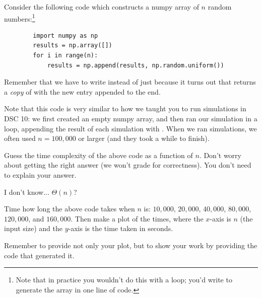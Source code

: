 \begin{prob}
    Consider the following code which constructs a numpy array of $n$ random numbers:\footnote{Note that in practice
        you wouldn't do this with a loop; you'd write  to generate
    the array in one line of code.}

    \begin{verbatim}
        import numpy as np
        results = np.array([])
        for i in range(n):
            results = np.append(results, np.random.uniform())
    \end{verbatim}

    Remember that we have to write 
    instead of just  because it turns out that
     returns a \emph{copy} of  with the new
    entry appended to the end.

    Note that this code is very similar to how we taught you to run simulations in
    DSC 10: we first created an empty numpy array, and then ran our simulation in a
    loop, appending the result of each simulation with .
    When we ran simulations, we often used $n = 100{,}000$ or larger (and they took a while
    to finish).

    \begin{subprobset}

        \begin{subprob}
            Guess the time complexity of the above code as a function of $n$. Don't worry
            about getting the right answer (we won't grade for correctness). You don't
            need to explain your answer.

            \begin{soln}
                I don't know... $\Theta(n)$?
            \end{soln}

        \end{subprob}

        \begin{subprob}
            Time how long the above code takes when $n$ is: $10{,}000$, $20{,}000$, $40{,}000$, $80{,}000$, $120{,}000$, and $160{,}000$.
            Then make a plot of the times, where the $x$-axis is $n$ (the input size) and the $y$-axis is the time taken in seconds.

            Remember to provide not only your plot, but to show your work by providing the code that generated it.


\end{subprob}
\end{subprobset}
\end{prob}
